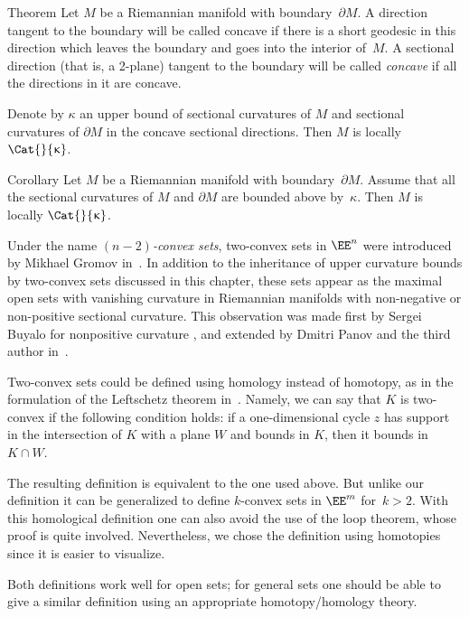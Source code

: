 \begin{thm}{Theorem}
Let $M$ be a Riemannian manifold with boundary~$\partial M$.
A direction tangent to the boundary will be called concave if there is a short geodesic in this direction which leaves the boundary and goes into the interior of~$M$.
A sectional direction (that is, a 2-plane) 
tangent to the boundary 
will be called \emph{concave} if all the directions in it are concave.

Denote by $\kappa$ an upper bound of sectional curvatures of $M$ and  
sectional curvatures of $\partial M$ in the concave sectional directions. 
Then $M$ is locally $\Cat{}{\kappa}$. 
\end{thm}

\begin{thm}{Corollary}
Let $M$ be a Riemannian manifold with boundary~$\partial M$. 
Assume that all the sectional curvatures of $M$ and $\partial M$ are bounded above by~$\kappa$.
Then $M$ is locally $\Cat{}{\kappa}$.
\end{thm}

Under the name \emph{$(n-2)$-convex sets}, 
two-convex sets in $\EE^n$ were introduced by Mikhael Gromov in~\cite{gromov:SaGMC}.
In addition to the inheritance of upper curvature bounds by two-convex sets discussed in this chapter, 
these sets appear as the maximal open sets with vanishing curvature in  Riemannian manifolds with non-negative or non-positive sectional curvature.
This observation was made first by Sergei Buyalo for nonpositive curvature \cite[Lemma 5.8]{buyalo}, 
and extended by Dmitri Panov and the third author in~\cite{panov-petrunin:sweeping}.

Two-convex sets could be defined using homology instead of homotopy, as in the formulation of the Leftschetz theorem in~\cite[\S\textonehalf]{gromov:SaGMC}.
Namely, we can say that $K$ is two-convex if the following condition holds: if a one-dimensional cycle $z$ has support in the intersection of $K$ with a plane $W$ and bounds in $K$, then it bounds in $K\cap W$.


The resulting definition is equivalent to the one used above.
But unlike our definition it can be generalized to define $k$-convex sets in $\EE^m$ for~$k>2$.
With this homological definition one can also avoid the use of the loop theorem, whose proof is quite involved.
Nevertheless, we chose the definition using homotopies  since it is easier to visualize.

Both definitions work well for open sets; for general sets one should be able to give a similar definition using  an appropriate homotopy/homology theory.

